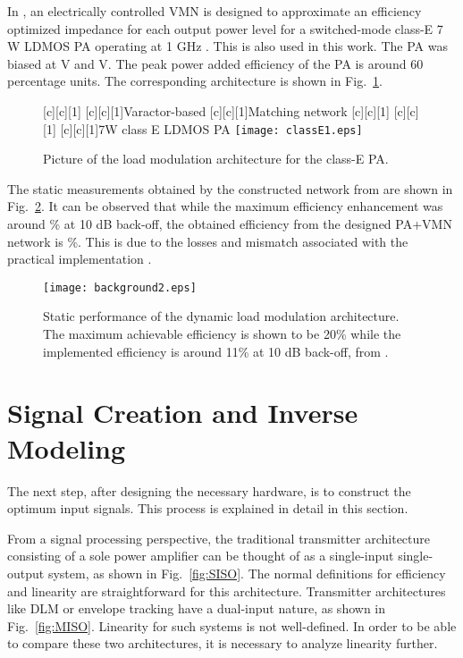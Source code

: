 \documentclass[10pt,journal]{IEEEtran}
\begin{document}
In \cite{hosseinEMW}, an electrically controlled VMN is designed to approximate an efficiency optimized impedance for each output power level for a switched-mode class-E 7 W LDMOS PA operating at 1 GHz \cite{adahl}. This is also used in this work. The PA was biased at  V and  V. The peak power added efficiency of the PA is around 60 percentage units. The corresponding architecture is shown in Fig.~\ref{classE}.

\begin{figure}
\centering
{}[c][c][1]{} [c][c][1]{Varactor-based} [c][c][1]{Matching network} [c][c][1]{} [c][c][1]{} [c][c][1]{7W class E LDMOS PA}
\texttt{[image: classE1.eps]}
\caption{Picture of the load modulation architecture for the class-E PA.}
\label{classE}
\end{figure}

The static measurements obtained by the constructed network from \cite{hosseinMTT} are shown in Fig.~\ref{back}. It can be observed that while the maximum efficiency enhancement was around \% at 10 dB back-off, the obtained efficiency from the designed PA+VMN network is \%. This is due to the losses and mismatch associated with the practical implementation \cite{hosseinMTT}.

\begin{figure}
\centering
\texttt{[image: background2.eps]}
\caption{Static performance of the dynamic load modulation architecture. The maximum achievable efficiency is shown to be 20\% while the implemented efficiency is around 11\% at 10 dB back-off, from \cite{hosseinMTT,soltani}.}
\label{back}
\end{figure}

\section{Signal Creation and Inverse Modeling}
The next step, after designing the necessary hardware, is to construct the optimum input signals. This process is explained in detail in this section.

From a signal processing perspective, the traditional transmitter architecture consisting of a sole power amplifier can be thought of as a single-input single-output system, as shown in Fig.~\ref{fig:SISO}. The normal definitions for efficiency and linearity are straightforward for this architecture. Transmitter architectures like DLM or envelope tracking have a dual-input nature, as shown in Fig.~\ref{fig:MISO}. Linearity for such systems is not well-defined. In order to be able to compare these two architectures, it is necessary to analyze linearity further.
\end{document}
